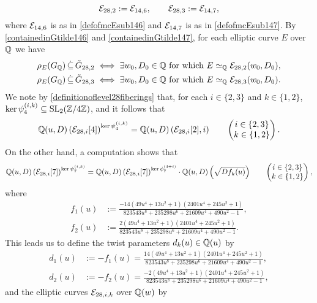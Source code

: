\[
\mathcal{E}_{28,2} := \mathcal{E}_{14,6}, \quad\quad \mathcal{E}_{28,3} := \mathcal{E}_{14,7},
\]
where $\mathcal{E}_{14,6}$ is as in \eqref{defofmcEsub146} and $\mathcal{E}_{14,7}$ is as in \eqref{defofmcEsub147}. By
\eqref{containedinGtilde146} and \eqref{containedinGtilde147}, for each elliptic curve $E$ over $\mathbb{Q}$ we have
\[
\begin{split}
\rho_{E}(G_{\mathbb{Q}}) \, \dot\subseteq \, \tilde{G}_{28,2} \; &\Longleftrightarrow \; \exists w_0, D_0 \in \mathbb{Q} \text{ for which } E \simeq_{\mathbb{Q}} \mathcal{E}_{28,2}(w_0,D_0), \\
\rho_{E}(G_{\mathbb{Q}}) \, \dot\subseteq \, \tilde{G}_{28,3} \; &\Longleftrightarrow \; \exists w_0, D_0 \in \mathbb{Q} \text{ for which } E \simeq_{\mathbb{Q}} \mathcal{E}_{28,3}(w_0,D_0).
\end{split}
\]
We note by \eqref{definitionoflevel28fiberings} that, for each $i \in \{2, 3\}$ and $k \in \{1, 2\}$, $\ker \psi_4^{(i,k)} \subseteq \operatorname{SL}_2(\mathbb{Z}/4\mathbb{Z})$, and it follows that
\[
\mathbb{Q}(u,D)\left( \mathcal{E}_{28,i}[4] \right)^{\ker \psi_4^{(i,k)}} = \mathbb{Q}(u,D)\left( \mathcal{E}_{28,i}[2], i \right) \quad\quad \begin{pmatrix} i \in \{ 2, 3 \} \\ k \in \{ 1, 2 \} \end{pmatrix}.
\]
On the other hand, a computation shows that
\[
\mathbb{Q}(u,D)\left( \mathcal{E}_{28,i}[7] \right)^{\ker \psi_7^{(i,k)}} = \mathbb{Q}(u,D)\left( \mathcal{E}_{28,i}[7] \right)^{\ker \phi_7^{(4+i)}} \cdot \mathbb{Q}(u,D) \left( \sqrt{D f_k(u)} \right) \quad\quad \begin{pmatrix} i \in \{ 2, 3 \} \\ k \in \{ 1, 2 \} \end{pmatrix},
\]
where
\[
\begin{split}
f_1(u) &:= \frac{-14(49u^4 + 13u^2 + 1)(2401u^4 + 245u^2 + 1)}{823543u^8 + 235298u^6 + 21609u^4 + 490u^2 - 1}, \\
f_2(u) &:= \frac{2(49u^4 + 13u^2 + 1)(2401u^4 + 245u^2 + 1)}{823543u^8 + 235298u^6 + 21609u^4 + 490u^2 - 1}.
\end{split}
\]
This leads us to define the twist parameters $d_k(u) \in \mathbb{Q}(u)$ by
\[
\begin{split}
d_1(u) &:= -f_1(u) = \frac{14(49u^4 + 13u^2 + 1)(2401u^4 + 245u^2 + 1)}{823543u^8 + 235298u^6 + 21609u^4 + 490u^2 - 1}, \\
d_2(u) &:= -f_2(u) = \frac{-2(49u^4 + 13u^2 + 1)(2401u^4 + 245u^2 + 1)}{823543u^8 + 235298u^6 + 21609u^4 + 490u^2 - 1},
\end{split}
\]
and the elliptic curves $\mathcal{E}_{28,i,k}$ over $\mathbb{Q}(w)$ by
